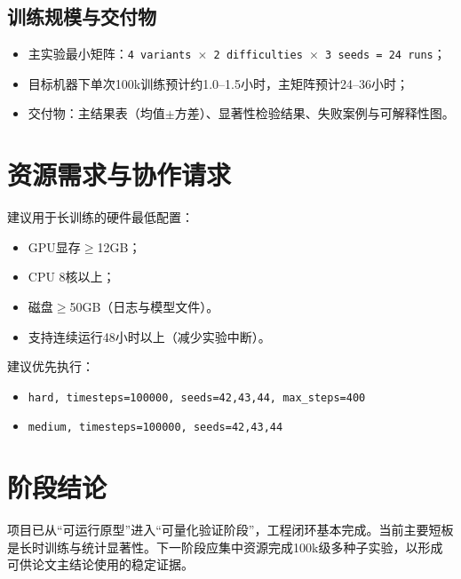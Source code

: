 \subsection{训练规模与交付物}
\begin{itemize}
    \item 主实验最小矩阵：\texttt{4 variants $\times$ 2 difficulties $\times$ 3 seeds = 24 runs}；
    \item 目标机器下单次100k训练预计约1.0--1.5小时，主矩阵预计24--36小时；
    \item 交付物：主结果表（均值$\pm$方差）、显著性检验结果、失败案例与可解释性图。
\end{itemize}

\section{资源需求与协作请求}
建议用于长训练的硬件最低配置：
\begin{itemize}
    \item GPU显存$\ge$12GB；
    \item CPU 8核以上；
    \item 磁盘$\ge$50GB（日志与模型文件）。
    \item 支持连续运行48小时以上（减少实验中断）。
\end{itemize}

建议优先执行：
\begin{itemize}
    \item \texttt{hard, timesteps=100000, seeds=42,43,44, max\_steps=400}
    \item \texttt{medium, timesteps=100000, seeds=42,43,44}
\end{itemize}

\section{阶段结论}
项目已从“可运行原型”进入“可量化验证阶段”，工程闭环基本完成。当前主要短板是长时训练与统计显著性。下一阶段应集中资源完成100k级多种子实验，以形成可供论文主结论使用的稳定证据。
